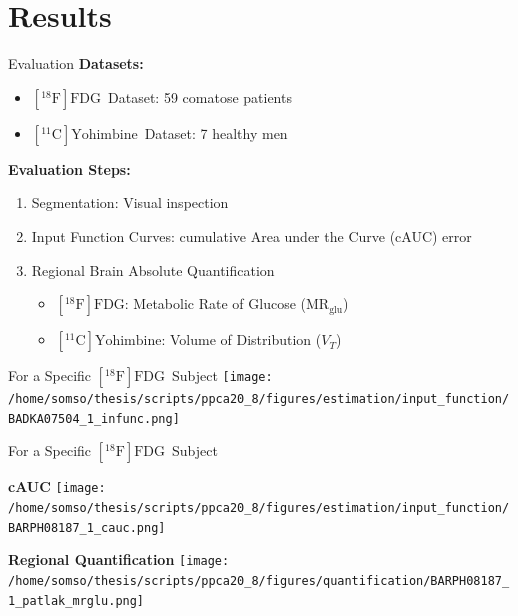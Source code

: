 \documentclass[aspectratio=169]{beamer}
\def\mrglu{\text{MR}_{\text{glu}}}
\newcommand{\fdg}{$[^{18}\mathrm{F}]\text{FDG}$}
\newcommand{\yohimbine}{$[^{11}\mathrm{C}]\text{Yohimbine}$}
\begin{document}
\section{Results}
%
\begin{frame}{Evaluation}
	\large{\textbf{Datasets:}}
	\begin{itemize}
		\setlength\itemsep{1.5em}
		\item \fdg\ Dataset: 59 comatose patients
		\item \yohimbine\ Dataset: 7 healthy men
	\end{itemize}
	\vspace{1em}
	\large{\textbf{Evaluation Steps:}}
	\begin{enumerate}
		\setlength\itemsep{1em}
		\item Segmentation: Visual inspection
		\item Input Function Curves: cumulative Area under the Curve (cAUC) error
		\item Regional Brain Absolute Quantification
		      \vspace{1ex}
		      \begin{itemize}
			      \setlength\itemsep{1em}
			      \item \fdg : Metabolic Rate of Glucose ($\mrglu$)
			      \item \yohimbine : Volume of Distribution ($V_T$)
		      \end{itemize}
	\end{enumerate}
\end{frame}

\begin{frame}[t]{For a Specific \fdg\ Subject}
	\texttt{[image: /home/somso/thesis/scripts/ppca20\_8/figures/estimation/input\_function/BADKA07504\_1\_infunc.png]}

\end{frame}

\begin{frame}[t]{For a Specific \fdg\ Subject}
	\begin{center}
		\vfill
		\begin{minipage}{0.48\textwidth}
			\centering
			\textbf{cAUC}
			\texttt{[image: /home/somso/thesis/scripts/ppca20\_8/figures/estimation/input\_function/BARPH08187\_1\_cauc.png]}
		\end{minipage}
		\begin{minipage}{0.48\textwidth}
			\centering
			\textbf{Regional Quantification}
			\texttt{[image: /home/somso/thesis/scripts/ppca20\_8/figures/quantification/BARPH08187\_1\_patlak\_mrglu.png]}
		\end{minipage}
		\vfill
	\end{center}
\end{frame}
\end{document}
